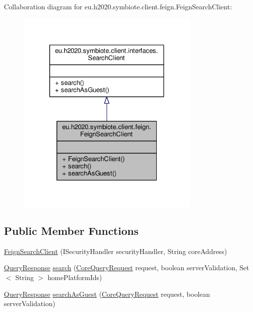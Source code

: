 Collaboration diagram for eu.\+h2020.\+symbiote.\+client.\+feign.\+Feign\+Search\+Client\+:\nopagebreak
\begin{figure}[H]
\begin{center}
\leavevmode
\includegraphics[width=254pt]{classeu_1_1h2020_1_1symbiote_1_1client_1_1feign_1_1FeignSearchClient__coll__graph}
\end{center}
\end{figure}
\subsection*{Public Member Functions}
\begin{DoxyCompactItemize}
\item 
\hyperlink{classeu_1_1h2020_1_1symbiote_1_1client_1_1feign_1_1FeignSearchClient_a661c390234d0f283a661e93d28ccc4d7}{Feign\+Search\+Client} (I\+Security\+Handler security\+Handler, String core\+Address)
\item 
\hyperlink{classeu_1_1h2020_1_1symbiote_1_1core_1_1ci_1_1QueryResponse}{Query\+Response} \hyperlink{classeu_1_1h2020_1_1symbiote_1_1client_1_1feign_1_1FeignSearchClient_a7ab11d6bbb16fb2dedb4c1deb13d0499}{search} (\hyperlink{classeu_1_1h2020_1_1symbiote_1_1core_1_1internal_1_1CoreQueryRequest}{Core\+Query\+Request} request, boolean server\+Validation, Set$<$ String $>$ home\+Platform\+Ids)
\item 
\hyperlink{classeu_1_1h2020_1_1symbiote_1_1core_1_1ci_1_1QueryResponse}{Query\+Response} \hyperlink{classeu_1_1h2020_1_1symbiote_1_1client_1_1feign_1_1FeignSearchClient_ae3379566327dc89bae6fb25cfafc68da}{search\+As\+Guest} (\hyperlink{classeu_1_1h2020_1_1symbiote_1_1core_1_1internal_1_1CoreQueryRequest}{Core\+Query\+Request} request, boolean server\+Validation)
\end{DoxyCompactItemize}


